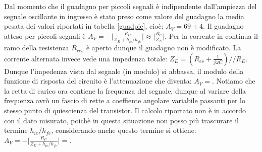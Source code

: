 \documentclass[10pt,a4paper]{article}
\begin{document}
Dal momento che il guadagno per piccoli segnali è indipendente dall'ampiezza del segnale oscillante in ingresso è stato preso come valore del guadagno la media pesata dei valori riportati in tabella \ref{guadpic}, cioè: $A_V = 69 \pm 4$. Il guadagno atteso per piccoli segnali è $A_V=-\vert \frac{R_C}{Z_E+h_{ie}/h_{fe}} \vert \approx \vert \frac{R_C}{Z_E} \vert$. 
Per la corrente in continua il ramo della resistenza $R_{res}$ è aperto dunque il guadagno non è modificato. La corrente alternata invece vede una impedenza totale: $Z_{E} = (R_{es}+\frac{1}{j \omega C})//R_{E}$. Dunque l'impedenza vista dal segnale (in modulo) si abbassa, il modulo della funzione di risposta del circuito è l'attenuazione che diventa: $A_V = $. Notiamo che la retta di carico ora contiene la frequenza del segnale, dunque al variare della frequenza avrò un fascio di rette a coeffiente angolare variabile passanti per lo stesso punto di quiescienza del transistor.
Il calcolo riportato non è in accordo con il dato misurato, poichè in questa situazione non posso più trascurare il termine $h_{ie}/h_{fe}$, considerando anche questo termine si ottiene: $A_V =-\vert \frac{R_C}{Z_E+h_{ie}/h_{fe}} \vert = $.
\end{document}
